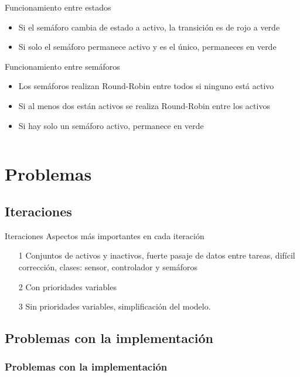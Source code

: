 \begin{frame}
\begin{columns}[T]
\begin{column}{.65\textwidth}
			\begin{block}{Funcionamiento entre estados}
				\begin{itemize}
					\item Si el semáforo cambia de estado a activo, la transición es de rojo a verde
					\item Si solo el semáforo permanece activo y es el único, permaneces en verde
				\end{itemize}
			\end{block}
			\begin{block}{Funcionamiento entre semáforos}
				\begin{itemize}
					\item Los semáforos realizan Round-Robin entre todos si ninguno está activo
					\item Si al menos dos están activos se realiza Round-Robin entre los activos
					\item Si hay solo un semáforo activo, permanece en verde
				\end{itemize}
			\end{block}
		
		\end{column}
	\end{columns}
\end{frame}

\section{Problemas}

\subsection{Iteraciones}

\begin{frame}
	\begin{block}{Iteraciones}
		Aspectos más importantes en cada iteración
		\begin{itemize}
			\item[1] Conjuntos de activos y inactivos, fuerte pasaje de datos entre tareas,  difícil corrección, clases: sensor, controlador y semáforos
			\item[2] Con prioridades variables
			\item[3] Sin prioridades variables, simplificación del modelo.
		\end{itemize}
	\end{block}
\end{frame}

\subsection{Problemas con la implementación}

\begin{frame}
	\frametitle{Problemas con la implementación}
\end{frame}